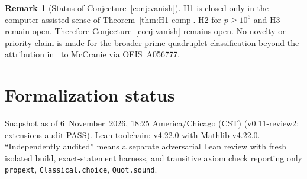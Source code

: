 \documentclass[11pt,reqno]{amsart}
\theoremstyle{definition}
\newtheorem{remark}[theorem]{Remark}
\begin{document}
\begin{remark}[Status of Conjecture~\ref{conj:vanish}]
H1 is closed only in the computer-assisted sense of Theorem~\ref{thm:H1-comp}. H2 for \(p\ge 10^6\) and H3 remain open. Therefore Conjecture~\ref{conj:vanish} remains open. No novelty or priority claim is made for the broader prime-quadruplet classification beyond the attribution in~\cite{RCW2026} to McCranie via OEIS~A056777.
\end{remark}

\section{Formalization status}
\label{sec:formalization}

Snapshot as of 6~November~2026, 18:25 America/Chicago (CST) (v0.11-review2; extensions audit PASS). Lean toolchain: v4.22.0 with Mathlib v4.22.0. ``Independently audited'' means a separate adversarial Lean review with fresh isolated build, exact-statement harness, and transitive axiom check reporting only \texttt{propext}, \texttt{Classical.choice}, \texttt{Quot.sound}.
\end{document}
